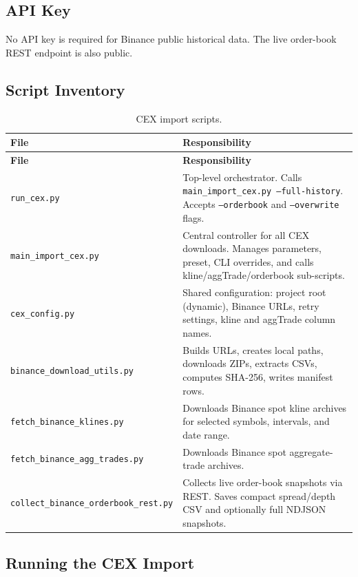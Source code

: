 \documentclass[11pt,a4paper]{article}
\begin{document}
\subsection{API Key}

No API key is required for Binance public historical data. The live order-book REST endpoint is also public.

\subsection{Script Inventory}

\begin{longtable}{L{5.2cm}L{9.2cm}}
\caption{CEX import scripts.}\\
\toprule
\textbf{File} & \textbf{Responsibility} \\
\midrule
\endfirsthead
\toprule
\textbf{File} & \textbf{Responsibility} \\
\midrule
\endhead
\bottomrule
\endfoot
\texttt{run\_cex.py} & Top-level orchestrator. Calls \texttt{main\_import\_cex.py --full-history}. Accepts \texttt{--orderbook} and \texttt{--overwrite} flags. \\
\texttt{main\_import\_cex.py} & Central controller for all CEX downloads. Manages parameters, preset, CLI overrides, and calls kline/aggTrade/orderbook sub-scripts. \\
\texttt{cex\_config.py} & Shared configuration: project root (dynamic), Binance URLs, retry settings, kline and aggTrade column names. \\
\texttt{binance\_download\_utils.py} & Builds URLs, creates local paths, downloads ZIPs, extracts CSVs, computes SHA-256, writes manifest rows. \\
\texttt{fetch\_binance\_klines.py} & Downloads Binance spot kline archives for selected symbols, intervals, and date range. \\
\texttt{fetch\_binance\_agg\_trades.py} & Downloads Binance spot aggregate-trade archives. \\
\texttt{collect\_binance\_orderbook\_rest.py} & Collects live order-book snapshots via REST. Saves compact spread/depth CSV and optionally full NDJSON snapshots. \\
\end{longtable}

\subsection{Running the CEX Import}
\end{document}
